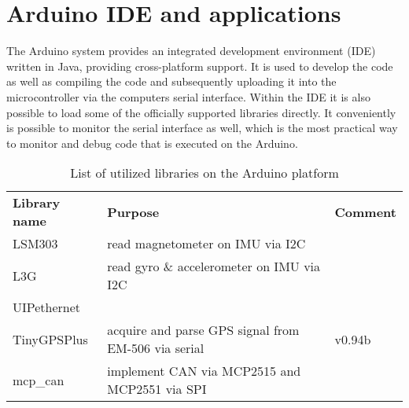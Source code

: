 \documentclass[ExampleMasters.tex]{subfiles}
\begin{document}
\section{Arduino IDE and applications}
\label{sec:arduino_applications}

The Arduino system provides an integrated development environment (IDE)  written in Java, providing cross-platform support. It is used to develop the code as well as compiling the code and subsequently uploading it into the microcontroller via the computers serial interface. Within the IDE it is also possible to load some of the officially supported libraries directly. It conveniently is possible to monitor the serial interface as well, which is the most practical way to monitor and debug code that is executed on the Arduino. 

\begin{table}[h]
	\label{tab:list_of_arduino_libs}
	\begin{tabular}{lll}
		\textbf{Library name} & \textbf{Purpose}                                    & \textbf{Comment} \\
		LSM303                & read magnetometer on IMU via I2C                    &                \cite{lsm303_github}  \\
		L3G                   & read gyro \& accelerometer on IMU via I2C           &      
		\cite{l3g_github}            \\
		UIPethernet           &                                                     &             \cite{uip_ethernet_github}     \\
		TinyGPSPlus           & acquire and parse GPS signal from EM-506 via serial & v0.94b\cite{tiny_gps_plus_github}     \\
		mcp\_can & implement CAN via MCP2515 and MCP2551 via SPI     & \cite{mcp_can_github}
	\end{tabular}
	
	\caption{List of utilized libraries on the Arduino platform}
\end{table}
\end{document}
